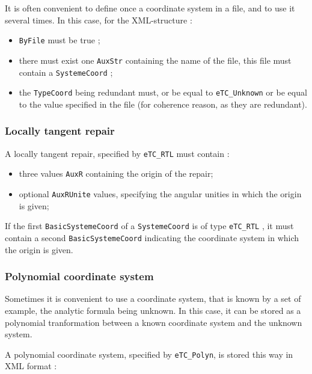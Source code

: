 It is often convenient to define once a coordinate system in a file, and
to use it several times. In  this case, for the XML-structure :


\begin{itemize}
   \item {\tt ByFile} must be true ;
   \item there must exist one {\tt AuxStr} containing the name of the file, this file
         must contain a {\tt SystemeCoord} ;
   \item the  {\tt TypeCoord} being redundant must, or be equal to {\tt eTC\_Unknown} or
         be equal to the value specified in the file (for coherence reason, as they are
         redundant).
\end{itemize}


\subsubsection{Locally tangent repair}

A locally tangent repair, specified by {\tt eTC\_RTL} must contain :

\begin{itemize}
   \item three values {\tt AuxR} containing the origin of the repair;
   \item optional {\tt AuxRUnite} values, specifying the angular unities in  which
         the origin is given;
\end{itemize}

If the first {\tt BasicSystemeCoord} of a {\tt SystemeCoord} is of type {\tt eTC\_RTL} ,
it must contain a second {\tt BasicSystemeCoord} indicating the coordinate system
in which the origin is given.


\subsubsection{Polynomial coordinate system}

Sometimes it is convenient to use a coordinate system, that is known by a set
of example, the analytic formula being unknown. In this case, it can be stored
as a polynomial tranformation between a known coordinate system and the unknown
system.

A polynomial coordinate system, specified by {\tt eTC\_Polyn},
 is stored this way in XML format :

